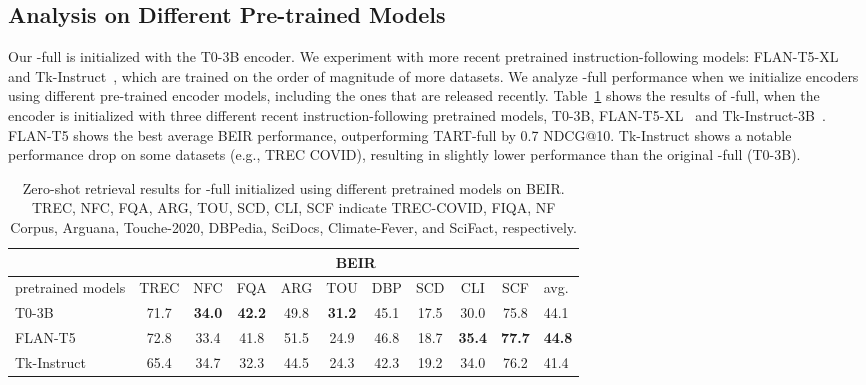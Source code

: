 \subsection{Analysis on Different Pre-trained Models}
Our \model-full is initialized with the T0-3B encoder. 
We experiment with more recent pretrained instruction-following models: FLAN-T5-XL~\cite{flan_palm} and Tk-Instruct~\cite{wang2022benchmarking}, which are trained on the order of magnitude of more datasets. 
We analyze \model-full performance when we initialize encoders using different pre-trained encoder models, including the ones that are released recently. 
Table~\ref{tab:diff_enc} shows the results of \model-full, when the encoder is initialized with three different recent instruction-following pretrained models, T0-3B, FLAN-T5-XL~\cite{flan_palm} and Tk-Instruct-3B~\cite{wang2022benchmarking}. 
FLAN-T5 shows the best average BEIR performance, outperforming TART-full by 0.7 NDCG@10. 
Tk-Instruct shows a notable performance drop on some datasets (e.g., TREC COVID), resulting in slightly lower performance than the original \model-full (T0-3B). 

\begin{table}[t!]
\centering
\small
\addtolength{\tabcolsep}{-2.25pt}  
\begin{tabular}{@{}l|cccccccccb}\toprule
  &\multicolumn{10}{c}{\textbf{BEIR}}  \\ \midrule
 pretrained models &TREC & NFC & FQA & ARG& TOU & DBP & SCD & CLI&SCF & avg.   \\\midrule
T0-3B  & 71.7 & {\bf 34.0} & {\bf 42.2} & 	49.8 & 	{\bf 31.2} & 	45.1 & 	17.5 & 	{30.0} & 	75.8 & 	{ 44.1} \\
FLAN-T5 & { 72.8} & 33.4 & 41.8 & { 51.5} & 24.9 & {46.8} & { 18.7} & {\bf  35.4} & {\bf 77.7} & {\bf 44.8}		 \\
Tk-Instruct &  65.4 & 34.7 & 32.3 & 44.5 & 24.3 & 42.3 & 19.2 & 34.0 & 76.2 & 41.4 \\
\bottomrule
\end{tabular}
    \caption{Zero-shot retrieval results for \model-full initialized using different pretrained models on BEIR. TREC, NFC, FQA, ARG, TOU, SCD, CLI, SCF indicate TREC-COVID, FIQA, NF Corpus, Arguana, Touche-2020, DBPedia, SciDocs, Climate-Fever, and SciFact, respectively. 
    }
    \label{tab:diff_enc}
\end{table}
